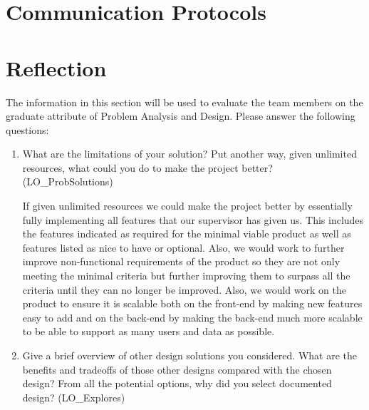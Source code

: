 \documentclass[12pt, titlepage]{article}
\begin{document}
\section{Communication Protocols}

\section{Reflection}

The information in this section will be used to evaluate the team members on the
graduate attribute of Problem Analysis and Design.  Please answer the following questions:

\begin{enumerate}
  \item What are the limitations of your solution?  Put another way, given
  unlimited resources, what could you do to make the project better? (LO\_ProbSolutions)
  
  If given unlimited resources we could make the project better by essentially fully implementing all features that our supervisor has given us. This includes the features indicated as required for the minimal viable product as well as features listed as nice to have or optional. Also, we would work to further improve non-functional requirements of the product so they are not only meeting the minimal criteria but further improving them to surpass all the criteria until they can no longer be improved. Also, we would work on the product to ensure it is scalable both on the front-end by making new features easy to add and on the back-end by making the back-end much more scalable to be able to support as many users and data as possible.
  
  \item Give a brief overview of other design solutions you considered.  What
  are the benefits and tradeoffs of those other designs compared with the chosen
  design?  From all the potential options, why did you select documented design?
  (LO\_Explores)
  

\end{enumerate}
\end{document}
